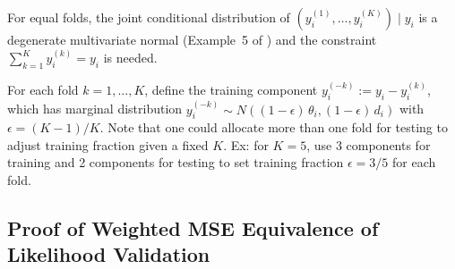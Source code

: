 \documentclass[11pt]{article}
\newcommand{\N}[2]{N\!\left(#1, #2\right)}
\theoremstyle{plain}
\theoremstyle{definition}
\theoremstyle{remark}
\begin{document}
For equal folds, the joint conditional distribution of $(y_i^{(1)}, \ldots, y_i^{(K)}) \mid y_i$ is a degenerate multivariate normal (Example~5 of \citealt{neufeld_data_2024}) and the constraint $\textstyle\sum_{k=1}^K y_i^{(k)} = y_i$ is needed.

For each fold $k = 1, \ldots, K$, define the training component $y_i^{(-k)} := y_i - y_i^{(k)}$, which has marginal distribution $y_i^{(-k)} \sim \N{(1-\epsilon)\,\theta_i}{(1-\epsilon)\,d_i}$ with $\epsilon = (K-1)/K$. Note that one could allocate more than one fold for testing to adjust training fraction given a fixed $K$. Ex: for $K=5$, use $3$ components for training and 2 components for testing to set training fraction $\epsilon=3/5$ for each fold.


\subsection{Proof of Weighted MSE Equivalence of Likelihood Validation}
\label{app:lik_mse}
\end{document}
